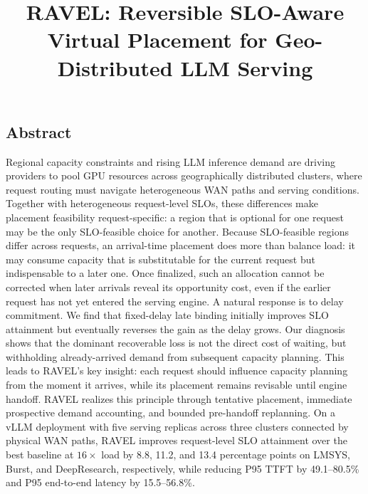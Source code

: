 \documentclass[letterpaper,twocolumn,10pt]{article}
\begin{document}
\date{}

\title{\Large \bf RAVEL: Reversible SLO-Aware Virtual Placement for Geo-Distributed LLM Serving}


\maketitle

\thispagestyle{empty}


\subsection*{Abstract}

Regional capacity constraints and rising LLM inference demand are driving
providers to pool GPU resources across geographically distributed clusters,
where request routing must navigate heterogeneous WAN paths and serving
conditions.
Together with heterogeneous request-level SLOs, these differences make
placement feasibility request-specific: a region that is optional for one
request may be the only SLO-feasible choice for another.
Because SLO-feasible regions differ across requests, an arrival-time placement
does more than balance load: it may consume capacity that is substitutable for
the current request but indispensable to a later one.
Once finalized, such an allocation cannot be corrected when later arrivals
reveal its opportunity cost, even if the earlier request has not yet entered
the serving engine.
A natural response is to delay commitment.
We find that fixed-delay late binding initially improves SLO attainment but
eventually reverses the gain as the delay grows.
Our diagnosis shows that the dominant recoverable loss is not the direct cost
of waiting, but withholding already-arrived demand from subsequent capacity
planning.
This leads to RAVEL's key insight: each request should influence capacity
planning from the moment it arrives, while its placement remains revisable
until engine handoff.
RAVEL realizes this principle through tentative placement, immediate
prospective demand accounting, and bounded pre-handoff replanning.
On a vLLM deployment with five serving replicas across three clusters connected
by physical WAN paths, RAVEL improves request-level SLO attainment over the
best baseline at $16\times$ load by 8.8, 11.2, and 13.4 percentage points on
LMSYS, Burst, and DeepResearch, respectively, while reducing P95 TTFT by
49.1--80.5\% and P95 end-to-end latency by 15.5--56.8\%.
\end{document}
